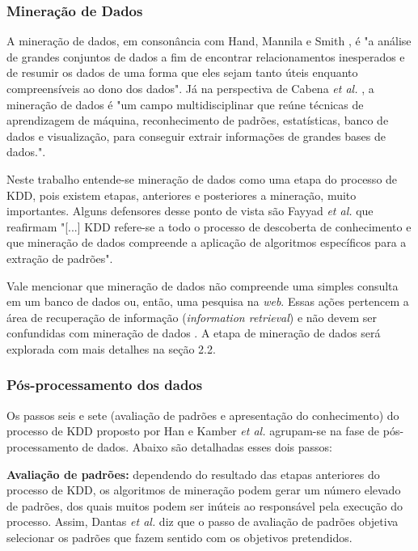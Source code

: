 \documentclass[tg]{mdtufsm}
\begin{document}
\subsubsection{Mineração de Dados}

A mineração de dados, em consonância com Hand, Mannila e Smith \citeyearpar{hand}, é "a análise de grandes conjuntos de dados a fim de encontrar relacionamentos inesperados e de resumir os dados de uma forma que eles sejam tanto úteis enquanto compreensíveis ao dono dos dados". Já na perspectiva de Cabena \textit{et al.} \citeyearpar{cabena}, a mineração de dados é "um campo multidisciplinar que reúne técnicas de aprendizagem de máquina, reconhecimento de padrões, estatísticas, banco de dados e visualização, para conseguir extrair informações de grandes bases de dados.". 

Neste trabalho entende-se mineração de dados como uma etapa do processo de KDD, pois existem etapas, anteriores e posteriores a mineração, muito importantes. Alguns defensores desse ponto de vista são Fayyad \textit{et al.} \citeyearpar{fayyad} que reafirmam "[...] KDD refere-se a todo o processo de descoberta de conhecimento e que mineração de dados compreende a aplicação de algoritmos específicos para a extração de padrões". 

Vale mencionar que mineração de dados não compreende uma simples consulta em um banco de dados ou, então, uma pesquisa na \textit{web}. Essas ações pertencem a área de recuperação de informação (\textit{information retrieval}) e não devem ser confundidas com mineração de dados \cite{pang-ning}. A etapa de mineração de dados será explorada com mais detalhes na seção 2.2.

\subsubsection{Pós-processamento dos dados}

Os passos seis e sete (avaliação de padrões e apresentação do conhecimento) do processo de KDD proposto por Han e Kamber \textit{et al.} \citeyearpar{Han-kamber2nd} agrupam-se na fase de pós-processamento de dados. Abaixo são detalhadas esses dois passos:

\textbf{Avaliação de padrões:} dependendo do resultado das etapas anteriores do processo de KDD, os algoritmos de mineração podem gerar um número elevado de padrões, dos quais muitos podem ser inúteis ao responsável pela execução do processo. Assim, Dantas \textit{et al.} \citeyearpar{dantas} diz que o passo de avaliação de padrões objetiva selecionar os padrões que fazem sentido com os objetivos pretendidos. 
\end{document}
